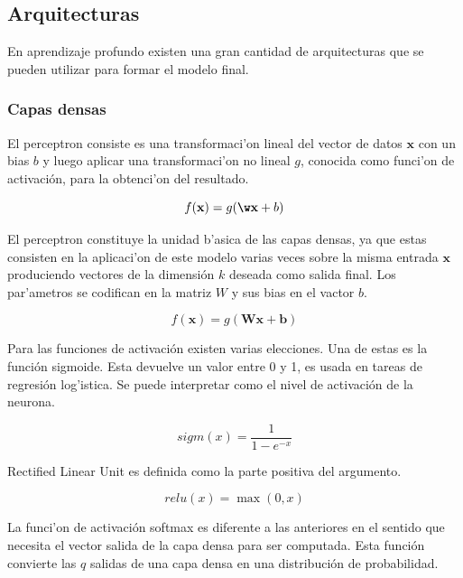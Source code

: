 \subsection{Arquitecturas}

En aprendizaje profundo existen una gran cantidad de arquitecturas que se pueden utilizar para formar el modelo 
final.

\subsubsection{Capas densas}

El perceptron consiste es una transformaci'on lineal del vector de datos $\textbf{x}$ con un bias $b$ y 
luego aplicar una transformaci'on no lineal $g$, conocida como funci'on de activación, 
para la obtenci'on del resultado.

\begin{equation}
	f(\textbf{x}) = g(\textbf{\w}\textbf{x} + b)
\end{equation}\label{eq:perceptron}

El perceptron constituye la unidad b'asica de las capas densas, ya que estas consisten en la aplicaci'on
de este modelo varias veces sobre la misma entrada $\textbf{x}$ produciendo vectores de la dimensión $k$ 
deseada como salida final. Los par'ametros se codifican en la matriz $W$ y sus bias en el vactor $b$.

\begin{equation}
	f(\textbf{x}) = g(\textbf{Wx} + \textbf{b})
\end{equation}\label{eq:dense}

Para las funciones de activación existen varias elecciones. Una de estas es la función sigmoide. 
Esta devuelve un valor entre 0 y 1, es usada en tareas de regresión log'istica. 
Se puede interpretar como el nivel de activación de la neurona.

\begin{equation}
	sigm(x) = \frac{1}{1-e^{-x}}
\end{equation}\label{eq:sigmoide}

Rectified Linear Unit es definida como la parte positiva del argumento. 

\begin{equation}
	relu(x) = \max(0, x)
\end{equation}\label{eq:relu}

La funci'on de activación softmax es diferente a las anteriores en el sentido que necesita
el vector salida de la capa densa para ser computada. Esta función convierte las $q$ salidas
de una capa densa en una distribución de probabilidad.

